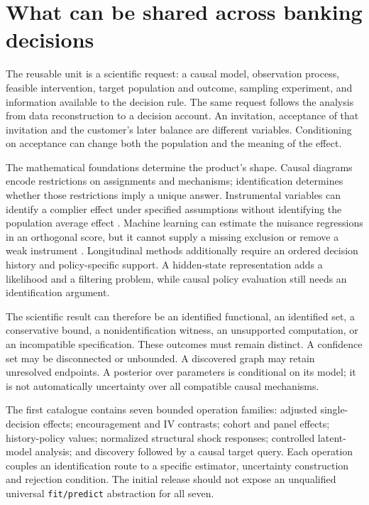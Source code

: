 \documentclass[11pt,a4paper,openany]{book}
\begin{document}
\mainmatter
\chapter{What can be shared across banking decisions}

The reusable unit is a scientific request: a causal model, observation
process, feasible intervention, target population and outcome, sampling
experiment, and information available to the decision rule. The same
request follows the analysis from data reconstruction to a decision account.
An invitation, acceptance of that invitation and the customer's later
balance are different variables. Conditioning on acceptance can change
both the population and the meaning of the effect.

The mathematical foundations determine the product's shape. Causal diagrams
encode restrictions on assignments and mechanisms; identification determines
whether those restrictions imply a unique answer. Instrumental variables
can identify a complier effect under specified assumptions without identifying
the population average effect \citep{angrist1996}. Machine learning can
estimate the nuisance regressions in an orthogonal score, but it cannot
supply a missing exclusion or remove a weak instrument
\citep{dml2018,staiger1994}. Longitudinal methods additionally require an
ordered decision history and policy-specific support. A hidden-state
representation adds a likelihood and a filtering problem, while causal
policy evaluation still needs an identification argument.

The scientific result can therefore be an identified functional, an
identified set, a conservative bound, a nonidentification witness, an
unsupported computation, or an incompatible specification. These outcomes
must remain distinct. A confidence set may be disconnected or unbounded.
A discovered graph may retain unresolved endpoints. A posterior over
parameters is conditional on its model; it is not automatically uncertainty
over all compatible causal mechanisms.

The first catalogue contains seven bounded operation families:
adjusted single-decision effects; encouragement and IV contrasts;
cohort and panel effects; history-policy values; normalized structural
shock responses; controlled latent-model analysis; and discovery followed
by a causal target query. Each operation couples an identification route
to a specific estimator, uncertainty construction and rejection condition.
The initial release should not expose an unqualified universal
\texttt{fit/predict} abstraction for all seven.
\end{document}
